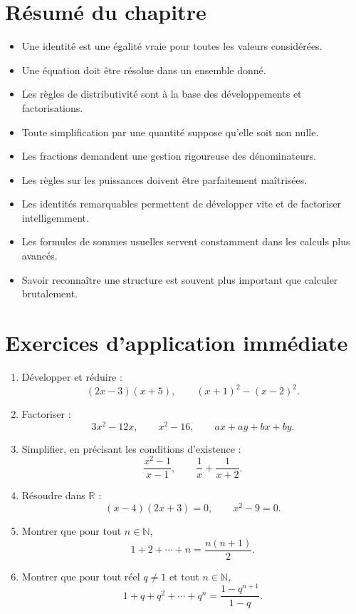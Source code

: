 \documentclass[11pt,a4paper]{article}
\theoremstyle{remark}
\newcommand{\R}{\mathbb{R}}
\newcommand{\N}{\mathbb{N}}
\begin{document}
\section{Résumé du chapitre}

\begin{itemize}
    \item Une identité est une égalité vraie pour toutes les valeurs considérées.
    \item Une équation doit être résolue dans un ensemble donné.
    \item Les règles de distributivité sont à la base des développements et factorisations.
    \item Toute simplification par une quantité suppose qu’elle soit non nulle.
    \item Les fractions demandent une gestion rigoureuse des dénominateurs.
    \item Les règles sur les puissances doivent être parfaitement maîtrisées.
    \item Les identités remarquables permettent de développer vite et de factoriser intelligemment.
    \item Les formules de sommes usuelles servent constamment dans les calculs plus avancés.
    \item Savoir reconnaître une structure est souvent plus important que calculer brutalement.
\end{itemize}

\section*{Exercices d’application immédiate}

\begin{enumerate}[label=\textbf{Exercice \arabic*.}]
    \item Développer et réduire :
    \[
    (2x-3)(x+5), \qquad (x+1)^2-(x-2)^2.
    \]

    \item Factoriser :
    \[
    3x^2-12x, \qquad x^2-16, \qquad ax+ay+bx+by.
    \]

    \item Simplifier, en précisant les conditions d’existence :
    \[
    \frac{x^2-1}{x-1}, \qquad \frac{1}{x}+\frac{1}{x+2}.
    \]

    \item Résoudre dans \(\R\) :
    \[
    (x-4)(2x+3)=0,
    \qquad
    x^2-9=0.
    \]

    \item Montrer que pour tout \(n\in\N\),
    \[
    1+2+\cdots+n=\frac{n(n+1)}{2}.
    \]

    \item Montrer que pour tout réel \(q\neq 1\) et tout \(n\in\N\),
    \[
    1+q+q^2+\cdots+q^n=\frac{1-q^{n+1}}{1-q}.
    \]
\end{enumerate}
\end{document}
